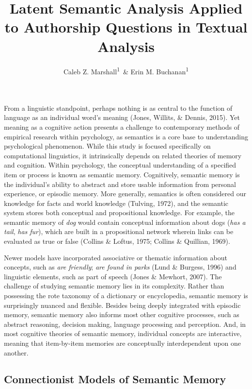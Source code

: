 \documentclass[english,man]{apa6}
\title{Latent Semantic Analysis Applied to Authorship Questions in Textual
Analysis}
\author{Caleb Z. Marshall\textsuperscript{1}~\& Erin M. Buchanan\textsuperscript{1}}
\affiliation{
    \vspace{0.5cm}
          \textsuperscript{1} Missouri State University  }
\theoremstyle{definition}
\theoremstyle{definition}
\theoremstyle{definition}
\theoremstyle{remark}
\begin{document}
\maketitle

\setcounter{secnumdepth}{0}



From a linguistic standpoint, perhaps nothing is as central to the
function of language as an individual word's meaning (Jones, Willits, \&
Dennis, 2015). Yet meaning as a cognitive action presents a challenge to
contemporary methods of empirical research within psychology, as
semantics is a core base to understanding psychological phenomenon.
While this study is focused specifically on computational linguistics,
it intrinsically depends on related theories of memory and cognition.
Within psychology, the conceptual understanding of a specified item or
process is known as semantic memory. Cognitively, semantic memory is the
individual's ability to abstract and store usable information from
personal experience, or episodic memory. More generally, semantics is
often considered our knowledge for facts and world knowledge (Tulving,
1972), and the semantic system stores both conceptual and propositional
knowledge. For example, the semantic memory of \emph{dog} would contain
conceptual information about dogs (\emph{has a tail}, \emph{has fur}),
which are built in a propositional network wherein links can be
evaluated as true or false (Collins \& Loftus, 1975; Collins \&
Quillian, 1969).

Newer models have incorporated associative or thematic information about
concepts, such as \emph{are friendly}; \emph{are found in parks} (Lund
\& Burgess, 1996) and linguistic elements, such as part of speech (Jones
\& Mewhort, 2007). The challenge of studying semantic memory lies in its
complexity. Rather than possessing the rote taxonomy of a dictionary or
encyclopedia, semantic memory is surprisingly nuanced and flexible.
Besides being deeply integrated with episodic memory, semantic memory
also informs most other cognitive processes, such as abstract reasoning,
decision making, language processing and perception. And, in most
cognitive theories of semantic memory, individual concepts are
interactive, meaning that item-by-item memories are conceptually
interdependent upon one another. \newline

\subsection{Connectionist Models of Semantic
Memory}\label{connectionist-models-of-semantic-memory}
\end{document}
